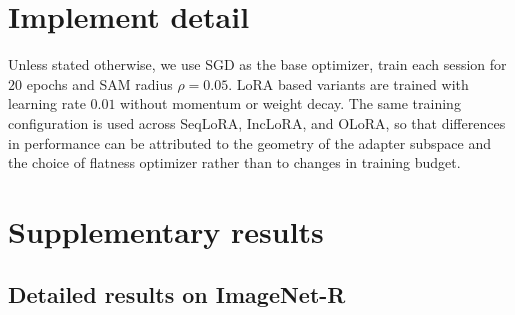 \documentclass{article}
\theoremstyle{plain}
\theoremstyle{definition}
\theoremstyle{remark}
\begin{document}
\section{Implement detail}


Unless stated otherwise, we use SGD as the base optimizer, train each session for $20$ epochs and SAM radius $\rho = 0.05$. LoRA based variants are trained with learning rate $0.01$ without momentum or weight decay. The same training configuration is used across SeqLoRA, IncLoRA, and OLoRA, so that differences in performance can be attributed to the geometry of the adapter subspace and the choice of flatness optimizer rather than to changes in training budget.



    
\section{Supplementary results}

\subsection{Detailed results on ImageNet-R}
\end{document}
